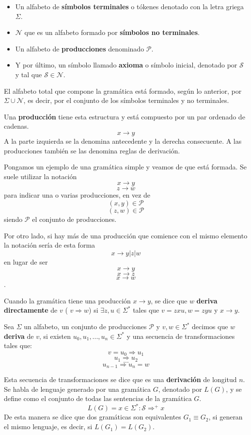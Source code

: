 \begin{itemize}
	\item Un alfabeto de \textbf{símbolos terminales} o tókenes denotado con la letra griega $\Sigma$.
	\item $\mathcal{N}$ que es un alfabeto formado por \textbf{símbolos no terminales}.
	\item Un alfabeto de \textbf{producciones} denominado $\mathcal{P}$.
	\item Y por último, un símbolo llamado \textbf{axioma} o símbolo inicial, denotado por $\mathcal{S}$ y tal que $\mathcal{S} \in \mathcal{N}$.
\end{itemize}

El alfabeto total que compone la gramática está formado, según lo anterior, por $\Sigma\cup\mathcal{N}$, es decir, por el conjunto de los símbolos terminales y no terminales.

Una \textbf{producción} tiene esta estructura y está compuesto por un par ordenado de cadenas. \[x \rightarrow y\] A la parte izquierda se la denomina antecedente y la derecha consecuente. A las producciones también se las denomina reglas de derivación.

Pongamos un ejemplo de una gramática simple y veamos de que está formada. Se suele utilizar la notación  \[x \rightarrow y\] \[z \rightarrow w\] para indicar una o varias producciones, en vez de \[(x, y) \in \mathcal{P} \] \[(z, w) \in \mathcal{P} \] siendo $\mathcal{P}$ el conjunto de producciones.

Por otro lado, si hay más de una producción que comience con el mismo elemento la notación sería de esta forma \[ x \rightarrow y | z | w\] en lugar de ser \[ x \rightarrow y\] \[x \rightarrow z\] \[x \rightarrow w\].

Cuando la gramática tiene una producción $x \rightarrow y$, se dice que $w$ \textbf{deriva directamente} de $v$ ( $v \Rightarrow w$) si $\exists z, u \in \Sigma^{*}$ tales que $v=zxu, w=zyu$ y $x\rightarrow y$.

Sea $\Sigma$ un alfabeto, un conjunto de producciones $\mathcal{P}$ y $v, w \in \Sigma^{*}$ decimos que $w$ \textbf{deriva} de $v$, si existen $u_{0}, u_{1}, ..., u_{n} \in \Sigma^{*}$ y una secuencia de transformaciones tales que:
 \[ v = u_{0} \Rightarrow u_{1}\] \[ u_{1} \Rightarrow u_{2}\] \[...\] \[ u_{n-1} \Rightarrow u_{n} = w\]

Esta secuencia de transformaciones se dice que es una \textbf{derivación} de longitud $n$. Se habla de lenguaje generado por una gramática $G$, denotado por $L(G)$, y se define como el conjunto de todas las sentencias de la gramática $G$.  \[L(G) = x\in \Sigma^{*}:\mathcal{S} \Rightarrow^{+}x\]
De esta manera se dice que dos gramáticas son equivalentes $G_{1} \equiv G_{2}$, si generan el mismo lenguaje, es decir, si $L(G_{1})=L(G_{2})$.

